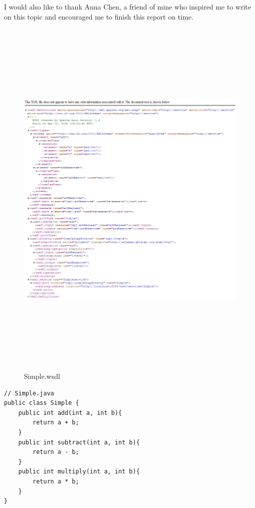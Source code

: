\documentclass[12pt]{article}
\begin{document}
I would also like to thank Anna Chen, a friend of mine who inspired me to write on this topic and encouraged me to finish this report on time.\\
\newpage


\begin{figure}[ht!]
\centering
\includegraphics[width=18cm,height=18cm,keepaspectratio]{img/wsdl.jpg}
\caption{Simple.wsdl}
\label{overflow}
\end{figure}

\newpage


\begin{lstlisting}
// Simple.java
public class Simple {
	public int add(int a, int b){
		return a + b;
	}
	public int subtract(int a, int b){
		return a - b;
	}
	public int multiply(int a, int b){
		return a * b;
	}
}
\end{lstlisting}
\end{document}
